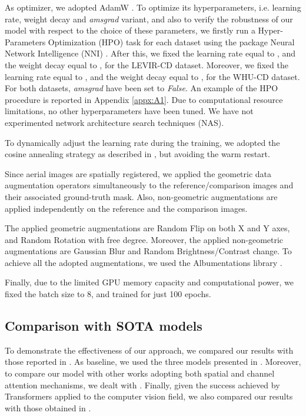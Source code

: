As optimizer, we adopted AdamW \cite{loshchilov2017decoupled}.
To optimize its hyperparameters, i.e. learning rate, weight decay and \emph{amsgrad} variant, 
and also to verify the robustness of our model with respect to the choice of these parameters,
we firstly run a Hyper-Parameters Optimization (HPO) task for each dataset using the package Neural Network Intelligence (NNI) \cite{nni2021}.
After this, we fixed the learning rate equal to , and the weight decay equal to , for the LEVIR-CD dataset.
Moreover, we fixed the learning rate equal to , and the weight decay equal to , for the WHU-CD dataset.
For both datasets, \emph{amsgrad} have been set to \emph{False}.
An example of the HPO procedure is reported in Appendix \ref{appx:A1}.
Due to computational resource limitations, no other hyperparameters have been tuned.
We have not experimented network architecture search techniques (NAS).

To dynamically adjust the learning rate during the training, 
we adopted the cosine annealing strategy as described in \cite{loshchilov2016sgdr},
but avoiding the warm restart.

Since aerial images are spatially registered, we applied the geometric data augmentation operators 
simultaneously to the reference/comparison images and their associated ground-truth mask.
Also, non-geometric augmentations are applied independently on the reference and the comparison images.

The applied geometric augmentations are Random Flip on both X and Y axes, and Random Rotation with free degree.
Moreover, the applied non-geometric augmentations are Gaussian Blur and Random Brightness/Contrast change.
To achieve all the adopted augmentations, we used the Albumentations library \cite{buslaev2020albumentations}.

Finally, due to the limited GPU memory capacity and computational power, we fixed the batch size to 8, and trained for just 100 epochs.


\subsection{Comparison with SOTA models}

To demonstrate the effectiveness of our approach, we compared our results with those reported in \cite{chen2021remote,bandara2022transformer}. 
As baseline, we used the three models presented in \cite{daudt2018fully}. 
Moreover, to compare our model with other works adopting both spatial and channel attention mechanisms,
we dealt with \cite{liu2020building,chen2020spatial,zhang2020deeply,fang2019dual}. 
Finally, given the success achieved by Transformers applied to the computer vision field, 
we also compared our results with those obtained in \cite{chen2021remote,bandara2022transformer}. 

